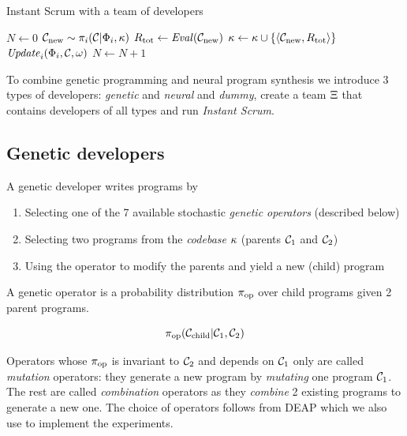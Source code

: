 \begin{algorithm}[H]
\begin{algorithmic}[1]
\caption{Instant Scrum with a team of developers}
\label{alg:instantscrum}
\State $N \gets 0$
\State $\mathcal{C}_\text{new}\sim \pi_i(\mathcal{C} | \Phi_i, \kappa)$ 
\State $R_\text{tot} \gets \mathit{Eval}(\mathcal{C}_\text{new})$
\State $\kappa \gets \kappa \cup \{\langle \mathcal{C}_\text{new}, R_\text{tot} \rangle\}$
\State $\mathit{Update}_i(\Phi_i, \mathcal{C}, \omega)$
\State $N \gets N+1$
\EndFor
\EndWhile
\EndProcedure
\end{algorithmic}
\end{algorithm}

To combine genetic programming and neural program synthesis we introduce 3 types of developers: \emph{genetic} and \emph{neural} and \emph{dummy}, create a team $\Xi$ that contains developers of all types and run \emph{Instant Scrum}.

\newpage \subsection{Genetic developers}
\label{sec:genetic}

A genetic developer writes programs by
\begin{enumerate}
    \item Selecting one of the 7 available stochastic \emph{genetic operators} (described below)
    \item Selecting two programs from the \emph{codebase} $\kappa$ (parents $\mathcal{C}_1$ and $\mathcal{C}_2$) 
    \item Using the operator to modify the parents and yield a new (child) program
\end{enumerate}

A genetic operator is a probability distribution $\pi_\text{op}$ over child programs given 2 parent programs. 

\begin{equation}
    \pi_\text{op}(\mathcal{C}_\text{child}|\mathcal{C}_1,\mathcal{C}_2)
\end{equation}

Operators whose $\pi_\text{op}$ is invariant to $\mathcal{C}_2$ and depends on $\mathcal{C}_1$ only are called \emph{mutation} operators: they generate a new program by \emph{mutating} one program $\mathcal{C}_1$.
The rest are called \emph{combination} operators as they \emph{combine} 2 existing programs to generate a new one.
The choice of operators follows from DEAP \cite{deap, derainvilleDEAPEnablingNimbler2014, derainvilleDEAPPythonFramework2012} which we also use to implement the experiments.

